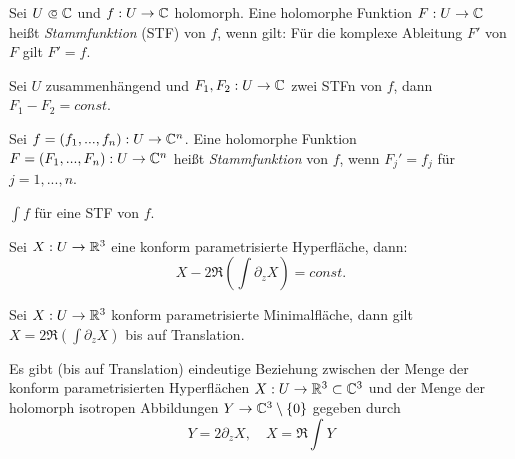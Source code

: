 \documentclass{cheat-sheet}
\begin{document}

\begin{defn}
  Sei $U \opn \C$ und $f : U \to \mathbb{C}$ holomorph. Eine holomorphe Funktion $F : U \to \mathbb{C}$ heißt \emph{Stammfunktion} (STF) von $f$, wenn gilt: Für die komplexe Ableitung $F'$ von $F$ gilt $F' = f$.
\end{defn}

\begin{bem}
  Sei $U$ zusammenhängend und $F_1, F_2 : U \to \mathbb{C}$ zwei STFn von $f$, dann $F_1 - F_2 = const$.
\end{bem}

\begin{defn}
  Sei $f = (f_1, ..., f_n) : U \to \mathbb{C}^n$. Eine holomorphe Funktion $F = (F_1, ..., F_n) : U \to \mathbb{C}^n$ heißt \emph{Stammfunktion} von $f$, wenn $F_j' = f_j$ für $j = 1, ..., n$.
\end{defn}

\begin{nota}
  $\int f$ für eine STF von $f$.
\end{nota}

\begin{lem}
  Sei $X : U \to \mathbb{R}^3$ eine konform parametrisierte Hyperfläche, dann:
  \[ X - 2 \Re (\int \partial_z X) = const. \]
\end{lem}

\begin{bem}
  Sei $X : U \to \mathbb{R}^3$ konform parametrisierte Minimalfläche, dann gilt $X = 2 \Re (\int \partial_z X)$ bis auf Translation.
\end{bem}

\begin{satz}
  Es gibt (bis auf Translation) eindeutige Beziehung zwischen der Menge der konform parametrisierten Hyperflächen $X : U \to \mathbb{R}^3 \subset \mathbb{C}^3$ und der Menge der holomorph isotropen Abbildungen $Y \to \mathbb{C}^3 \setminus \{ 0 \}$ gegeben durch
  \[ Y = 2 \partial_z X, \quad X = \Re \int Y \]
\end{satz}



\end{document}
